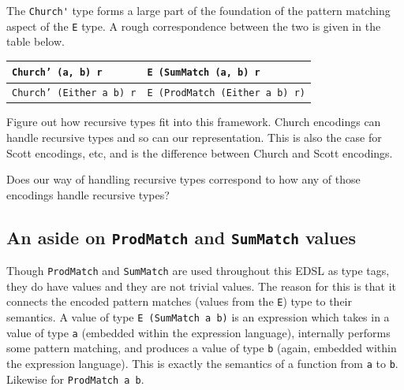 \documentclass[runningheads, a4paper]{llncs}
\newcommand{\ttt}{\texttt}
\newcommand{\showtodos}{}  %
\newenvironment{todo}
  {\ifthenelse{\isundefined{\showtodos}}{\comment}{\begin{tcolorbox}
    \textbf{TODO}:}}
  {\ifthenelse{\isundefined{\showtodos}}{\endcomment}{\end{tcolorbox}}
  }
\begin{document}
The \verb|Church'| type forms a large part of the foundation of the pattern
matching aspect of the \verb|E| type. A rough correspondence between the two
is given in the table below.\\

{\small
\noindent\begin{tabular}{|p{3.4cm}|p{4.4cm}|}
  \hline
  \ttt{Church' (a, b) r} & \ttt{E (SumMatch (a, b) r} \\
  \hline
  \ttt{Church' (Either a b) r} & \ttt{E (ProdMatch (Either a b) r)}\\
  \hline
\end{tabular}
}


\begin{todo}
  Figure out how recursive types fit into this framework. Church encodings can
  handle recursive types and so can our representation. This is also the case
  for Scott encodings, etc, and is the difference between Church and Scott
  encodings.

  Does our way of handling recursive types correspond to how any of
  those encodings handle recursive types?

\end{todo}




\subsection{An aside on \ttt{ProdMatch} and \ttt{SumMatch} values}
\label{sec:MatchAside}

Though \ttt{ProdMatch} and \ttt{SumMatch} are used throughout this EDSL as type
tags, they do have values and they are not trivial values. The reason for this
is that it connects the encoded pattern matches (values from the \ttt{E}) type
to their semantics. A value of type \ttt{E (SumMatch a b)} is an expression
which takes in a value of type \ttt{a} (embedded within the expression
language), internally performs some pattern matching, and produces a value of
type \ttt{b} (again, embedded within the expression language). This is exactly
the semantics of a function from \ttt{a} to \ttt{b}. Likewise for \ttt{ProdMatch a b}.
\end{document}
